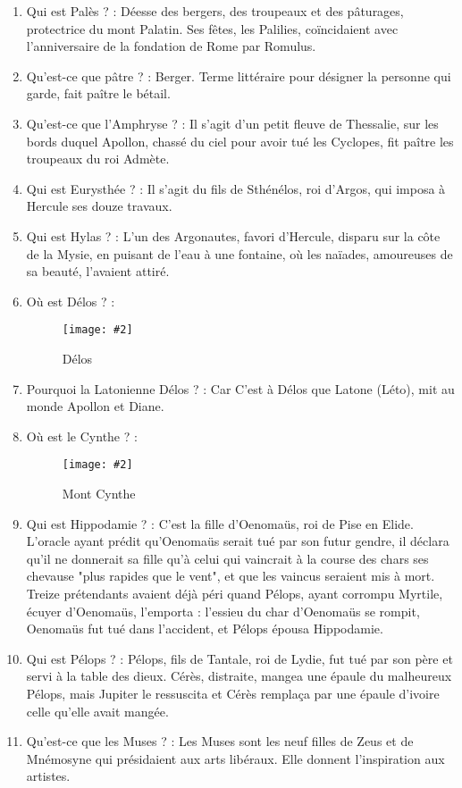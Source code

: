 \documentclass[a4paper, 11pt, hidelinks]{article}
\newcommand{\img}[4]{\begin{figure}[!ht]
    \centering
    \texttt{[image: \#2]}
    \caption{#3}
    \label{#4}
    \end{figure} }
\begin{document}
\begin{enumerate}
      \item Qui est Palès ? : Déesse des bergers, des troupeaux et des pâturages, protectrice du mont Palatin. Ses fêtes, les Palilies, coïncidaient avec l'anniversaire de la fondation de Rome par Romulus.
      \item Qu'est-ce que pâtre ? : Berger. Terme littéraire pour désigner la personne qui garde, fait paître le bétail.
      \item Qu'est-ce que l'Amphryse ? : Il s'agit d'un petit fleuve de Thessalie, sur les bords duquel Apollon, chassé du ciel pour avoir tué les Cyclopes, fit paître les troupeaux
            du roi Admète.
      \item Qui est Eurysthée ? : Il s'agit du fils de Sthénélos, roi d'Argos, qui imposa à Hercule ses douze travaux.
      \item Qui est Hylas ? : L'un des Argonautes, favori d'Hercule, disparu sur la côte de la Mysie, en puisant de l'eau à une fontaine, où les naïades, amoureuses de sa beauté, l'avaient attiré.
      \item Où est Délos ? :
            \img{0.3}{Délos.png}{Délos}{109}
            \newpage
      \item Pourquoi la Latonienne Délos ? : Car C'est à Délos que Latone (Léto), mit au monde Apollon et Diane.
      \item Où est le Cynthe ? :
            \img{0.4}{Cynthe.png}{Mont Cynthe}{110}
      \item Qui est Hippodamie ? : C'est la fille d'Oenomaüs, roi de Pise en Elide. L'oracle ayant prédit qu'Oenomaüs serait tué par son futur gendre, il déclara qu'il ne donnerait
            sa fille qu'à celui qui vaincrait à la course des chars ses chevause "plus rapides que le vent", et que les vaincus seraient mis à mort. Treize prétendants avaient déjà
            péri quand Pélops, ayant corrompu Myrtile, écuyer d'Oenomaüs, l'emporta : l'essieu du char d'Oenomaüs se rompit, Oenomaüs fut tué dans l'accident, et Pélops épousa Hippodamie.
      \item Qui est Pélops ? : Pélops, fils de Tantale, roi de Lydie, fut tué par son père et servi à la table des dieux. Cérès, distraite, mangea une épaule du malheureux Pélops,
            mais Jupiter le ressuscita et Cérès remplaça par une épaule d'ivoire celle qu'elle avait mangée.
      \item Qu'est-ce que les Muses ? : Les Muses sont les neuf filles de Zeus et de Mnémosyne qui présidaient aux arts libéraux. Elle donnent l'inspiration aux artistes.

\end{enumerate}
\end{document}

